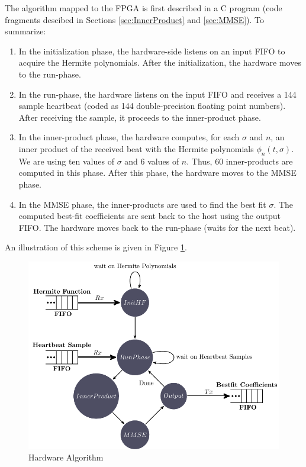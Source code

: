 \documentclass[runningheads]{llncs}
\begin{document}
The algorithm mapped to the FPGA 
is first described in a C program (code fragments descibed in Sections \ref{sec:InnerProduct} and \ref{sec:MMSE}).
To summarize:
\begin{enumerate}
\item In the initialization phase, the hardware-side listens on an input FIFO to acquire
the Hermite polynomials.  After the initialization, the hardware moves to the run-phase.
\item In the run-phase, the hardware listens on the input FIFO and receives a 144 sample
heartbeat (coded as 144 double-precision floating point numbers).  After receiving
the sample, it proceeds to the inner-product phase.
\item In the inner-product phase, the hardware computes, for each $\sigma$ and
$n$, an inner product of the received beat with the Hermite polynomials $\phi_n(t,\sigma)$.
We are using ten values of $\sigma$ and $6$ values of $n$.  Thus, 60 inner-products
are computed in this phase.  After this phase, the hardware moves to the MMSE
phase.
\item  In the MMSE phase, the inner-products are used to find the best fit $\sigma$.
The computed best-fit coefficients are sent back to the host using the output FIFO.
The hardware moves back to the run-phase (waits for the next beat).
\end{enumerate}
An illustration of this scheme is given in Figure \ref{fig:HWAlgorithm}.

\begin{figure}
\begin{center}
	\includegraphics[scale=0.80]{stateMachine.pdf}
	\caption{Hardware Algorithm}
	\label{fig:HWAlgorithm}
\end{center}
\end{figure}
\end{document}
